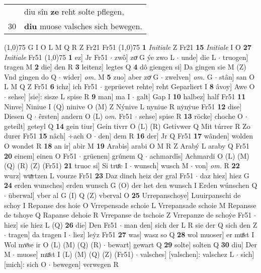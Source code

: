 \documentclass[8pt,a4paper,notitlepage]{article}
\begin{document}
\begin{table}[ht]
\begin{minipage}[t]{0.5\linewidth}
\begin{tabular}{rl}
 & diu sîn \textbf{ze} reht solte pflegen,\\ 
30 & \textbf{diu} muose valsches sich bewegen.\\ 
\end{tabular}
\scriptsize
\line(1,0){75} \newline
G I O L M Q R Z Fr21 Fr51 \newline
\line(1,0){75} \newline
\textbf{1} \textit{Initiale} Z Fr21  \textbf{15} \textit{Initiale} I O  \textbf{27} \textit{Initiale} Fr51  \newline
\line(1,0){75} \newline
\textbf{1} ez] Jr Fr51  $\cdot$ zwô] zoͮ G ýe zwo L  $\cdot$ unde] die L  $\cdot$ truogen] tragen M \textbf{2} die] den R \textbf{3} leitenz] legtes Q \textbf{4} dô giengen si] Da gingen sie M (Z) Vnd gingen do Q  $\cdot$ wider] \textit{om.} M \textbf{5} zuo] aber zoͮ G  $\cdot$ zwelven] \textit{om.} G  $\cdot$ stân] san O L M Q Z Fr51 \textbf{6} ichz] ich Fr51  $\cdot$ geprüevet rehte] reht Geparliert I \textbf{8} âvoy] Awe O  $\cdot$ sehse] [sie]: sisze L spise R \textbf{9} man] ma I  $\cdot$ galt] Gap I \textbf{10} halbez] half Fr51 \textbf{11} Ninve] Niniue I (Q) ninive O (M) Z Nýnive L nyniue R nẏnẏue Fr51 \textbf{12} dise] Diesen Q  $\cdot$ êrsten] andern O (L) o\textit{m. } Fr51  $\cdot$ sehse] spise R \textbf{13} röcke] choche O  $\cdot$ geteilt] geteyl Q \textbf{14} gein tiur] Gein tivrr O (L) (R) Getivwer Q Mit túrrer R Zo durer Fr51 \textbf{15} nâch] ÷ach O  $\cdot$ den] dem R \textbf{16} der] Jr Q Fr51 \textbf{17} wânden] wolden O wondet R \textbf{18} an ir] abir M \textbf{19} Arabis] arabi O M R Z Arabý L araby Q Fr51 \textbf{20} einem] einen O Fr51  $\cdot$ grüenen] grúnem Q  $\cdot$ achmardîs] Achmardi O (L) (M) (Q) (R) (Z) (Fr51) \textbf{21} truoc si] Si truͤc I  $\cdot$ wunsch] wusch M  $\cdot$ von] \textit{om.} R \textbf{22} wurz] wuͯrtzen L vourze Fr51 \textbf{23} Daz dinch heiz der gral Fr51  $\cdot$ daz hiez] hiez G \textbf{24} erden wunsches] erden wunsch G (O) der het den wunsch I Erden wúnschen Q  $\cdot$ überwal] vber al G (I) Q (Z) vberval O \textbf{25} Urrepanschoye] Luuirpanschi de schoy I Repanse des hoie O Vrrepensade schoie L Vrrepansade schoie M Repansse de tshoye Q Rapanse dehoie R Vrrepanse de tschoie Z Vrrepanze de schoẏe Fr51  $\cdot$ hiez] sie hiez L (Q) \textbf{26} die] Den Fr51  $\cdot$ man den] sich der L R sie der Q sich den Z  $\cdot$ tragen] da tragen I  $\cdot$ liez] leẏz Fr51 \textbf{27} was] wasz so Q \textbf{28} wol muoser] er muͤst I Wol mvͦse ir O (L) (M) (Q) (R)  $\cdot$ bewart] gewart Q \textbf{29} solte] solten Q \textbf{30} diu] Der M  $\cdot$ muose] muͤst I (L) (M) (Q) (Z) (Fr51)  $\cdot$ valsches] [valschen]: valschez L  $\cdot$ sich] [mich]: sich O  $\cdot$ bewegen] verwegen R \newline

\end{minipage}
\end{table}
\end{document}
